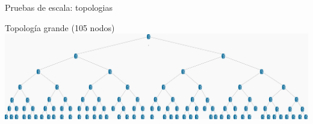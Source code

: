 \documentclass[xcolor=svgnames]{beamer}
\begin{document}
\begin{frame}{Pruebas de escala: topologias}
	\begin{center}
		Topología grande (105 nodos)
		\includegraphics[scale=0.09]{large_topology}
	\end{center}
\end{frame}

%
\end{document}
